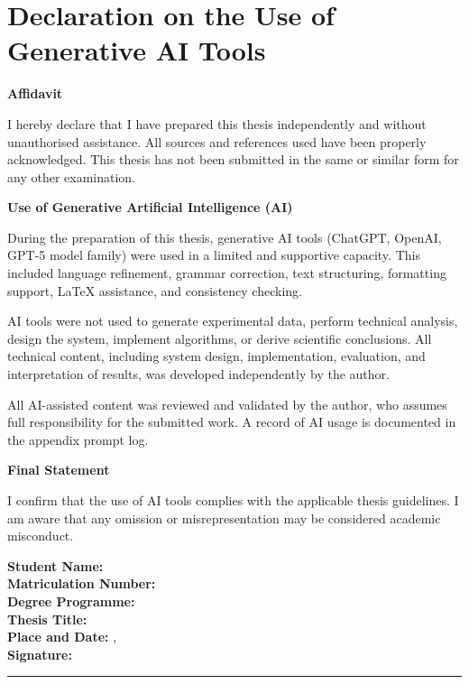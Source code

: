 \chapter*{Declaration on the Use of Generative AI Tools}
\begingroup
\small
\setlength{\parskip}{0pt}
\setlength{\parindent}{0pt}
\vspace*{-1.5\baselineskip}

\noindent
\textbf{Affidavit}

\noindent
I hereby declare that I have prepared this thesis independently and without unauthorised assistance. All sources and references used have been properly acknowledged. This thesis has not been submitted in the same or similar form for any other examination.

\vspace{0.4em}

\noindent
\textbf{Use of Generative Artificial Intelligence (AI)}

\noindent
During the preparation of this thesis, generative AI tools (ChatGPT, OpenAI, GPT-5 model family) were used in a limited and supportive capacity. This included language refinement, grammar correction, text structuring, formatting support, LaTeX assistance, and consistency checking.

\noindent
AI tools were not used to generate experimental data, perform technical analysis, design the system, implement algorithms, or derive scientific conclusions. All technical content, including system design, implementation, evaluation, and interpretation of results, was developed independently by the author.

\noindent
All AI-assisted content was reviewed and validated by the author, who assumes full responsibility for the submitted work. A record of AI usage is documented in the appendix prompt log.

\vspace{0.4em}

\noindent
\textbf{Final Statement}

\noindent
I confirm that the use of AI tools complies with the applicable thesis guidelines. I am aware that any omission or misrepresentation may be considered academic misconduct.

\vspace{0.8em}

\noindent
\textbf{Student Name:} \student \\[0.25em]
\textbf{Matriculation Number:} \matrnr \\[0.25em]
\textbf{Degree Programme:} \studies \\[0.25em]
\textbf{Thesis Title:} \thesistitleEN \\[0.5em]

\textbf{Place and Date:} \submissionplace, \submissiondate \\[0.8em]

\textbf{Signature:} \rule{6cm}{0.4pt}
\endgroup
